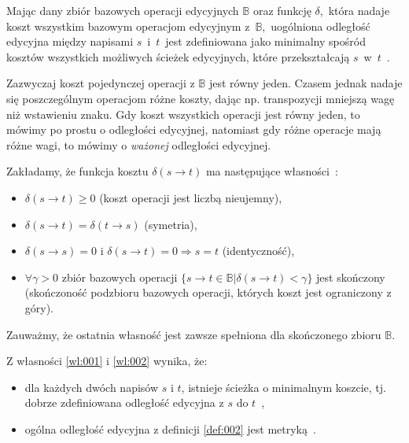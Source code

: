 \documentclass{praca1}
\begin{document}
\begin{definition}\label{def:002}
Mając dany zbiór bazowych operacji edycyjnych $\mathbb{B}$ oraz funkcję $\delta$,~która nadaje koszt wszystkim bazowym operacjom edycyjnym z~$\mathbb{B}$,~uogólniona odległość edycyjna między napisami $s$~i~$t$~jest zdefiniowana jako minimalny spośród kosztów wszystkich możliwych ścieżek edycyjnych, które przekształcają $s$~w~$t$~\cite{Boytsov2011:indexingmethods}.
\end{definition}

Zazwyczaj koszt pojedynczej operacji z $\mathbb{B}$ jest równy jeden. Czasem jednak nadaje się poszczególnym operacjom różne koszty, dając np. transpozycji mniejszą wagę niż wstawieniu znaku. Gdy koszt wszystkich operacji jest równy jeden, to mówimy po prostu o odległości edycyjnej, natomiast gdy różne operacje mają różne wagi, to mówimy o \emph{ważonej} odległości edycyjnej.

\begin{property}\label{wl:002}
Zakładamy, że funkcja kosztu $\delta(s \rightarrow t)$ ma następujące własności~\cite{Boytsov2011:indexingmethods}:
\begin{itemize}
\item $\delta(s \rightarrow t) \geq 0$ (koszt operacji jest liczbą nieujemny),
\item $\delta(s \rightarrow t) = \delta(t \rightarrow s)$ (symetria),
\item $\delta(s \rightarrow s) = 0\text{ i } \delta(s \rightarrow t) = 0 \Rightarrow s = t$ (identyczność),
\item $\forall \gamma > 0$ zbiór bazowych operacji $\{s \rightarrow t \in \mathbb{B} | \delta(s \rightarrow t) < \gamma \}$ jest skończony (skończoność podzbioru bazowych operacji, których koszt jest ograniczony z góry).
\end{itemize}
\end{property}

Zauważmy, że ostatnia własność jest zawsze spełniona dla skończonego zbioru $\mathbb{B}$.

\begin{theorem}
Z własności \ref{wl:001} i \ref{wl:002} wynika, że:
\begin{itemize}
\item dla każdych dwóch napisów $s$ i $t$, istnieje ścieżka o minimalnym koszcie, tj. dobrze zdefiniowana odległość edycyjna z $s$ do $t$~\cite{Boytsov2011:indexingmethods},
\item ogólna odległość edycyjna z definicji \ref{def:002} jest metryką~\cite{Wagner1974:stringtostring}.
\end{itemize}
\end{theorem}
\end{document}
